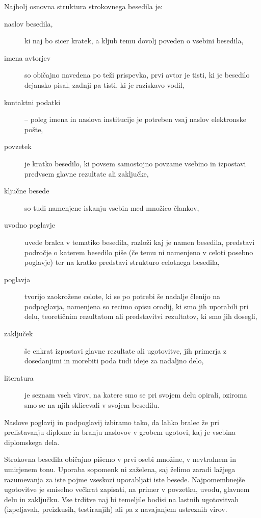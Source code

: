 \documentclass[a4paper,12pt,openright]{book}
\begin{document}
    Najbolj osnovna struktura strokovnega besedila je:
    \begin{description}
        \item[naslov besedila,] ki naj bo sicer kratek, a kljub temu dovolj poveden o vsebini besedila,
        \item[imena avtorjev] so običajno navedena po teži prispevka, prvi avtor je tisti, ki je besedilo dejansko pisal, zadnji pa tisti, ki je raziskavo vodil,
        \item[kontaktni podatki] -- poleg imena in naslova institucije je potreben vsaj naslov elektronske pošte,
        \item[povzetek] je kratko besedilo, ki povsem samostojno povzame vsebino in izpostavi predvsem glavne rezultate ali zaključke,
        \item[ključne besede] so tudi namenjene iskanju vsebin med množico člankov,
        \item[uvodno poglavje] uvede bralca v tematiko besedila, razloži kaj je namen besedila, predstavi področje o katerem besedilo piše
        (če temu ni namenjeno v celoti posebno poglavje) ter na kratko predstavi strukturo celotnega besedila,
        \item[poglavja] tvorijo zaokrožene celote, ki se po potrebi še nadalje členijo na podpoglavja, namenjena so recimo opisu orodij,
        ki smo jih uporabili pri delu, teoretičnim rezultatom ali predstavitvi rezultatov, ki smo jih dosegli,
        \item[zaključek] še enkrat izpostavi glavne rezultate ali ugotovitve, jih primerja z dosedanjimi in morebiti poda tudi ideje za nadaljno delo,
        \item[literatura] je seznam vseh virov, na katere smo se pri svojem delu opirali, oziroma smo se na njih sklicevali v svojem besedilu.
    \end{description}

    Naslove poglavij in podpoglavij izbiramo tako, da lahko bralec že pri prelistavanju diplome in branju naslovov
    v grobem ugotovi, kaj je vsebina diplomskega dela.

    Strokovna besedila običajno pišemo v prvi osebi množine, v nevtralnem in umirjenem tonu.
    Uporaba sopomenk ni zaželena, saj želimo zaradi lažjega razumevanja za iste pojme vseskozi uporabljati iste besede.
    Najpomembnejše ugotovitve je smiselno večkrat zapisati, na primer v povzetku, uvodu, glavnem delu in zaključku.
    Vse trditve naj bi temeljile bodisi na lastnih ugotovitvah (izpeljavah, preizkusih, testiranjih) ali pa z navajanjem ustreznih virov.
\end{document}
